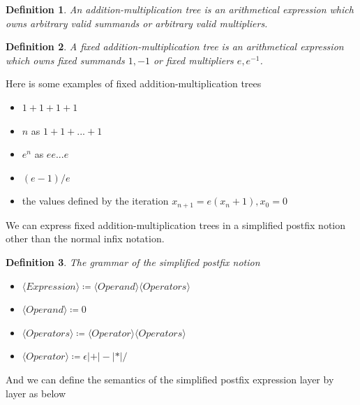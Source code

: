 \documentclass{article}
\newtheorem{definition}{Definition}
\begin{document}
\begin{definition}
An addition-multiplication tree is an arithmetical expression which owns arbitrary valid summands or arbitrary valid multipliers.
\end{definition}

\begin{definition}
A fixed addition-multiplication tree is an arithmetical expression which owns fixed summands $1, -1$
or fixed multipliers $e, e^{-1}$.
\end{definition}

Here is some examples of fixed addition-multiplication trees
\begin{itemize}
    \item $1 + 1 + 1 + 1$
    \item $n$ as $1 + 1 + ... + 1$
    \item $e^n$ as $e e ... e$
    \item $(e - 1) / e $
    \item the values defined by the iteration $x_{n+1} = e (x_n + 1), x_0 = 0$
\end{itemize}

We can express fixed addition-multiplication trees in a simplified postfix notion other than the normal infix notation.

\begin{definition}
    The grammar of the simplified postfix notion
    \begin{itemize}
    \item $\langle Expression \rangle \coloneqq \langle Operand \rangle \langle Operators \rangle$
    \item $\langle Operand \rangle \coloneqq 0$
    \item $\langle Operators \rangle \coloneqq \langle Operator \rangle \langle Operators \rangle$
    \item $\langle Operator \rangle \coloneqq \epsilon | + | - | * | /$
    \end{itemize}
\end{definition}

And we can define the semantics of the simplified postfix expression layer by layer as below
\end{document}
